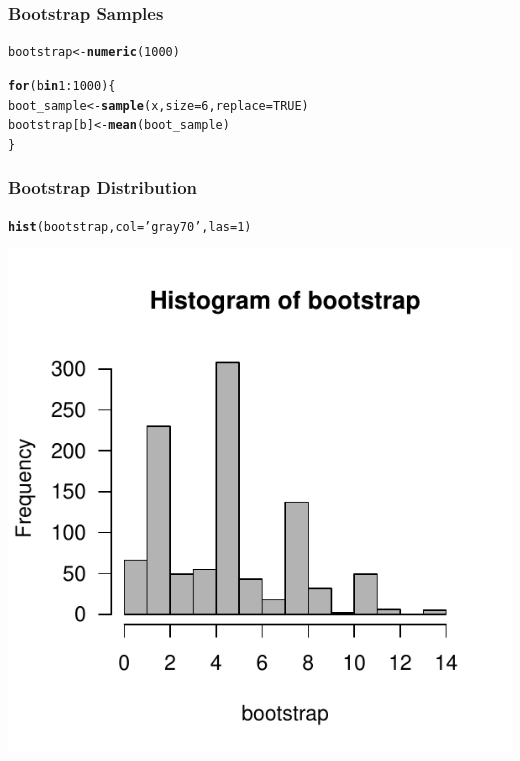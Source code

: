 \documentclass[12pt]{beamer}\usepackage[]{graphicx}\usepackage[]{color}
\makeatletter
\newcommand{\hlnum}[1]{\textcolor[rgb]{0.686,0.059,0.569}{#1}}%
\newcommand{\hlstr}[1]{\textcolor[rgb]{0.192,0.494,0.8}{#1}}%
\newcommand{\hlopt}[1]{\textcolor[rgb]{0,0,0}{#1}}%
\newcommand{\hlstd}[1]{\textcolor[rgb]{0.345,0.345,0.345}{#1}}%
\newcommand{\hlkwa}[1]{\textcolor[rgb]{0.161,0.373,0.58}{\textbf{#1}}}%
\newcommand{\hlkwb}[1]{\textcolor[rgb]{0.69,0.353,0.396}{#1}}%
\newcommand{\hlkwc}[1]{\textcolor[rgb]{0.333,0.667,0.333}{#1}}%
\newcommand{\hlkwd}[1]{\textcolor[rgb]{0.737,0.353,0.396}{\textbf{#1}}}%
\newenvironment{kframe}{%
 \def\at@end@of@kframe{}%
 \ifinner\ifhmode%
  \def\at@end@of@kframe{\end{minipage}}%
  \begin{minipage}{\columnwidth}%
 \fi\fi%
 \def\FrameCommand##1{\hskip\@totalleftmargin \hskip-\fboxsep
 \colorbox{shadecolor}{##1}\hskip-\fboxsep
     \hskip-\linewidth \hskip-\@totalleftmargin \hskip\columnwidth}%
 \MakeFramed {\advance\hsize-\width
   \@totalleftmargin\z@ \linewidth\hsize
   \@setminipage}}%
 {\par\unskip\endMakeFramed%
 \at@end@of@kframe}
\newenvironment{knitrout}{}{} %
\makeatother
\begin{document}

\begin{frame}[fragile]
\frametitle{Bootstrap Samples}

\begin{knitrout}\footnotesize
{}\color{fgcolor}\begin{kframe}
\begin{alltt}
\hlstd{bootstrap} \hlkwb{<-} \hlkwd{numeric}\hlstd{(}\hlnum{1000}\hlstd{)}

\hlkwa{for} \hlstd{(b} \hlkwa{in} \hlnum{1}\hlopt{:}\hlnum{1000}\hlstd{) \{}
  \hlstd{boot_sample} \hlkwb{<-} \hlkwd{sample}\hlstd{(x,} \hlkwc{size} \hlstd{=} \hlnum{6}\hlstd{,} \hlkwc{replace} \hlstd{=} \hlnum{TRUE}\hlstd{)}
  \hlstd{bootstrap[b]} \hlkwb{<-} \hlkwd{mean}\hlstd{(boot_sample)}
\hlstd{\}}
\end{alltt}
\end{kframe}
\end{knitrout}

\end{frame}


\begin{frame}[fragile]
\frametitle{Bootstrap Distribution}
\begin{knitrout}\tiny
{}\color{fgcolor}\begin{kframe}
\begin{alltt}
\hlkwd{hist}\hlstd{(bootstrap,} \hlkwc{col} \hlstd{=} \hlstr{'gray70'}\hlstd{,} \hlkwc{las} \hlstd{=} \hlnum{1}\hlstd{)}
\end{alltt}
\end{kframe}

{\centering \includegraphics[width=.6\linewidth,height=.6\linewidth]{figure/unnamed-chunk-25-1} 

}



\end{knitrout}

\end{frame}
\end{document}
